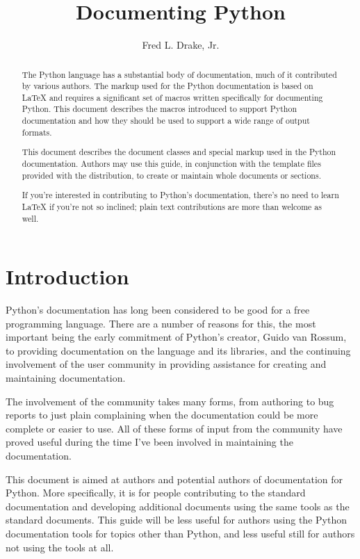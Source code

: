 \documentclass{howto}
\title{Documenting Python}
\author{Fred L. Drake, Jr.}
\begin{document}
\maketitle

\begin{abstract}
\noindent
The Python language has a substantial body of
documentation, much of it contributed by various authors.  The markup
used for the Python documentation is based on \LaTeX{} and requires a
significant set of macros written specifically for documenting Python.
This document describes the macros introduced to support Python
documentation and how they should be used to support a wide range of
output formats.

This document describes the document classes and special markup used
in the Python documentation.  Authors may use this guide, in
conjunction with the template files provided with the
distribution, to create or maintain whole documents or sections.

If you're interested in contributing to Python's documentation,
there's no need to learn \LaTeX{} if you're not so inclined; plain
text contributions are more than welcome as well.
\end{abstract}

\tableofcontents


\section{Introduction \label{intro}}

  Python's documentation has long been considered to be good for a
  free programming language.  There are a number of reasons for this,
  the most important being the early commitment of Python's creator,
  Guido van Rossum, to providing documentation on the language and its
  libraries, and the continuing involvement of the user community in
  providing assistance for creating and maintaining documentation.

  The involvement of the community takes many forms, from authoring to
  bug reports to just plain complaining when the documentation could
  be more complete or easier to use.  All of these forms of input from
  the community have proved useful during the time I've been involved
  in maintaining the documentation.

  This document is aimed at authors and potential authors of
  documentation for Python.  More specifically, it is for people
  contributing to the standard documentation and developing additional
  documents using the same tools as the standard documents.  This
  guide will be less useful for authors using the Python documentation
  tools for topics other than Python, and less useful still for
  authors not using the tools at all.
\end{document}
